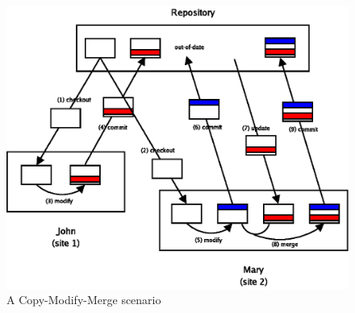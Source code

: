 \begin{flushleft}
\begin{figure}[ht]
\begin{flushright}
\includegraphics{img/cmm.eps}
\end{flushright}
\caption{A Copy-Modify-Merge scenario}
\label{fig:cmm}
\end{figure}
\end{flushleft}

